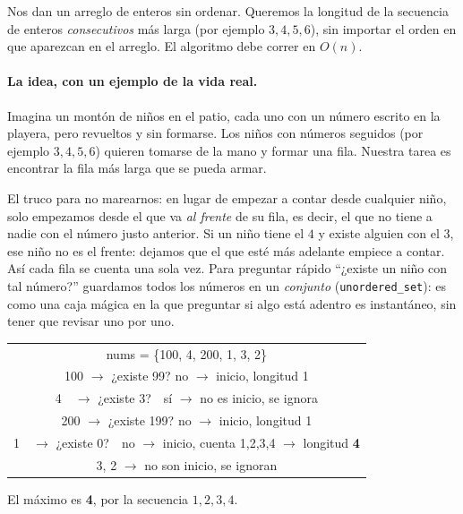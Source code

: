 
Nos dan un arreglo de enteros sin ordenar. Queremos la longitud de la
secuencia de enteros \emph{consecutivos} más larga (por ejemplo $3,4,5,6$),
sin importar el orden en que aparezcan en el arreglo. El algoritmo debe
correr en $O(n)$.

\paragraph{La idea, con un ejemplo de la vida real.} Imagina un montón de
niños en el patio, cada uno con un número escrito en la playera, pero
revueltos y sin formarse. Los niños con números seguidos (por ejemplo
$3,4,5,6$) quieren tomarse de la mano y formar una fila. Nuestra tarea es
encontrar la fila más larga que se pueda armar.

El truco para no marearnos: en lugar de empezar a contar desde cualquier
niño, solo empezamos desde el que va \emph{al frente} de su fila, es decir,
el que no tiene a nadie con el número justo anterior. Si un niño tiene el
$4$ y existe alguien con el $3$, ese niño no es el frente: dejamos que el
que esté más adelante empiece a contar. Así cada fila se cuenta una sola
vez. Para preguntar rápido ``¿existe un niño con tal número?'' guardamos
todos los números en un \emph{conjunto} (\texttt{unordered\_set}): es como
una caja mágica en la que preguntar si algo está adentro es instantáneo, sin
tener que revisar uno por uno.

\begin{center}
\ttfamily
\begin{tabular}{c}
nums = \{100, 4, 200, 1, 3, 2\}\\[4pt]
100 $\to$ ¿existe 99? no $\to$ inicio, longitud 1\\
4\ \ $\to$ ¿existe 3?\ \ sí $\to$ no es inicio, se ignora\\
200 $\to$ ¿existe 199? no $\to$ inicio, longitud 1\\
1\ \ $\to$ ¿existe 0?\ \ no $\to$ inicio, cuenta 1,2,3,4 $\to$ longitud \textbf{4}\\
3, 2 $\to$ no son inicio, se ignoran\\
\end{tabular}
\end{center}

\noindent El máximo es \textbf{4}, por la secuencia $1,2,3,4$.

